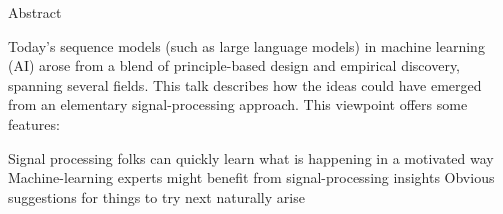 \begin{slide}[\slideopts,toc={}]{Abstract}

Today's sequence models (such as large language models) in machine
learning (AI) arose from a blend of principle-based design and
empirical discovery, spanning several fields.
\maybepause
This talk describes how the ideas could have emerged from an elementary signal-processing
approach.
\maybepause
This viewpoint offers some features:
\begin{enumerate}
\mpitem Signal processing folks can quickly learn what is happening in a motivated way
\mpitem Machine-learning experts might benefit from signal-processing insights
\mpitem Obvious suggestions for things to try next naturally arise
\end{enumerate}


\end{slide}
